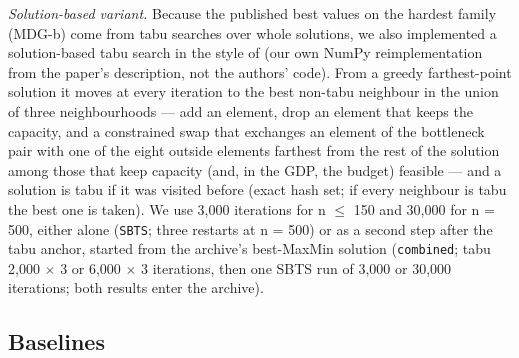 \emph{Solution-based variant.} Because the published best values on the hardest family (MDG-b) come from tabu searches over whole solutions, we also implemented a solution-based tabu search in the style of \citet{lu2023} (our own NumPy reimplementation from the paper's description, not the authors' code). From a greedy farthest-point solution it moves at every iteration to the best non-tabu neighbour in the union of three neighbourhoods --- add an element, drop an element that keeps the capacity, and a constrained swap that exchanges an element of the bottleneck pair with one of the eight outside elements farthest from the rest of the solution among those that keep capacity (and, in the GDP, the budget) feasible --- and a solution is tabu if it was visited before (exact hash set; if every neighbour is tabu the best one is taken). We use 3,000 iterations for n $\leq$ 150 and 30,000 for n = 500, either alone (\texttt{SBTS}; three restarts at n = 500) or as a second step after the tabu anchor, started from the archive's best-MaxMin solution (\texttt{combined}; tabu 2,000 $\times$ 3 or 6,000 $\times$ 3 iterations, then one SBTS run of 3,000 or 30,000 iterations; both results enter the archive).

\subsection{Baselines}\label{sec:baselines}

